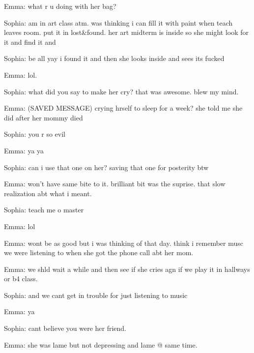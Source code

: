 Emma: what r u doing with her bag?



Sophia:  am in art class atm.  was thinking i can fill it with paint when teach leaves room.  put it in lost&found.  her art midterm is inside so she might look for it and find it and



Sophia: be all yay i found it and then she looks inside and sees its fucked



Emma: lol.



Sophia: what did you say to make her cry?  that was awesome.  blew my mind.



Emma: (SAVED MESSAGE) crying hrself to sleep for a week?  she told me she did after her mommy died



Sophia:  you r so evil



Emma: ya ya



Sophia: can i use that one on her?  saving that one for posterity btw



Emma: won't have same bite to it.  brilliant bit was the suprise.  that slow realization abt what i meant.



Sophia: teach me o master



Emma: lol



Emma: wont be as good but i was thinking of that day.  think i remember musc we were listening to when she got the phone call abt her mom.



Emma: we shld wait a while and then see if she cries agn if we play it in hallways or b4 class.



Sophia:  and we cant get in trouble for just listening to music



Emma: ya



Sophia: cant believe you were her friend.



Emma: she was lame but not depressing and lame @ same time.



